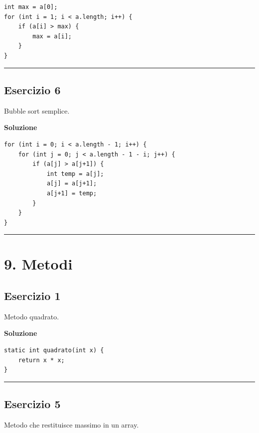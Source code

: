 \documentclass[
]{article}
\begin{document}
\begin{verbatim}
int max = a[0];
for (int i = 1; i < a.length; i++) {
    if (a[i] > max) {
        max = a[i];
    }
}
\end{verbatim}

\begin{center}\rule{0.5\linewidth}{0.5pt}\end{center}

\subsection{Esercizio 6}\label{esercizio-6-3}

Bubble sort semplice.

\textbf{Soluzione}

\begin{verbatim}
for (int i = 0; i < a.length - 1; i++) {
    for (int j = 0; j < a.length - 1 - i; j++) {
        if (a[j] > a[j+1]) {
            int temp = a[j];
            a[j] = a[j+1];
            a[j+1] = temp;
        }
    }
}
\end{verbatim}

\begin{center}\rule{0.5\linewidth}{0.5pt}\end{center}

\section{9. Metodi}\label{metodi}

\subsection{Esercizio 1}\label{esercizio-1-8}

Metodo quadrato.

\textbf{Soluzione}

\begin{verbatim}
static int quadrato(int x) {
    return x * x;
}
\end{verbatim}

\begin{center}\rule{0.5\linewidth}{0.5pt}\end{center}

\subsection{Esercizio 5}\label{esercizio-5-1}

Metodo che restituisce massimo in un array.
\end{document}
